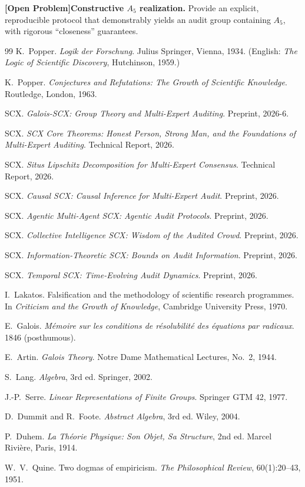 \documentclass[12pt,a4paper]{article}
\theoremstyle{remark}
\newcommand{\openproblem}{\textnormal{\textbf{[Open Problem]}}}
\begin{document}
\openproblem \textbf{Constructive \(A_5\) realization.} Provide an explicit, reproducible protocol that demonstrably yields an audit group containing \(A_5\), with rigorous ``closeness'' guarantees.
\begin{thebibliography}{99}
K.~Popper.
\emph{Logik der Forschung}.
Julius Springer, Vienna, 1934.
(English: \emph{The Logic of Scientific Discovery}, Hutchinson, 1959.)

K.~Popper.
\emph{Conjectures and Refutations: The Growth of Scientific Knowledge}.
Routledge, London, 1963.

SCX.
\emph{Galois-SCX: Group Theory and Multi-Expert Auditing}.
Preprint, 2026-6.

SCX.
\emph{SCX Core Theorems: Honest Person, Strong Man, and the Foundations of Multi-Expert Auditing}.
Technical Report, 2026.

SCX.
\emph{Situs Lipschitz Decomposition for Multi-Expert Consensus}.
Technical Report, 2026.

SCX.
\emph{Causal SCX: Causal Inference for Multi-Expert Audit}.
Preprint, 2026.

SCX.
\emph{Agentic Multi-Agent SCX: Agentic Audit Protocols}.
Preprint, 2026.

SCX.
\emph{Collective Intelligence SCX: Wisdom of the Audited Crowd}.
Preprint, 2026.

SCX.
\emph{Information-Theoretic SCX: Bounds on Audit Information}.
Preprint, 2026.

SCX.
\emph{Temporal SCX: Time-Evolving Audit Dynamics}.
Preprint, 2026.

I.~Lakatos.
Falsification and the methodology of scientific research programmes.
In \emph{Criticism and the Growth of Knowledge}, Cambridge University Press, 1970.

E.~Galois.
\emph{M\'emoire sur les conditions de r\'esolubilit\'e des \'equations par radicaux}.
1846 (posthumous).

E.~Artin.
\emph{Galois Theory}.
Notre Dame Mathematical Lectures, No.~2, 1944.

S.~Lang.
\emph{Algebra}, 3rd ed.
Springer, 2002.

J.-P.~Serre.
\emph{Linear Representations of Finite Groups}.
Springer GTM 42, 1977.

D.~Dummit and R.~Foote.
\emph{Abstract Algebra}, 3rd ed.
Wiley, 2004.

P.~Duhem.
\emph{La Th\'eorie Physique: Son Objet, Sa Structure}, 2nd ed.
Marcel Rivi\`ere, Paris, 1914.

W.~V.~Quine.
Two dogmas of empiricism.
\emph{The Philosophical Review}, 60(1):20--43, 1951.
\end{thebibliography}
\end{document}
